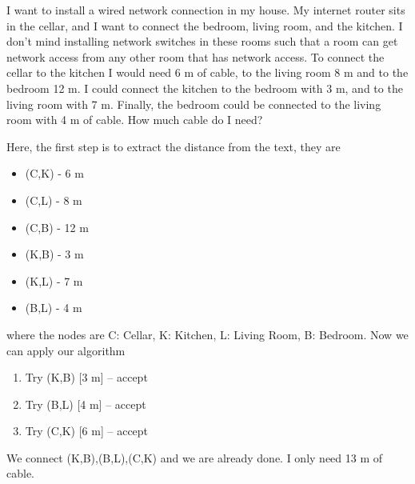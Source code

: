 




I want to install a wired network connection in my house. My internet router sits in the cellar, and I want to connect the bedroom, living room, and the kitchen. I don't mind installing network switches in these rooms such that a room can get network access from any other room that has network access. To connect the cellar to the kitchen I would need 6 m of cable, to the living room 8 m and to the bedroom 12 m. I could connect the kitchen to the bedroom with 3 m, and to the living room with 7 m. Finally, the bedroom could be connected to the living room with 4 m of cable. How much cable do I need? 


\solution
Here, the first step is to extract the distance from the text, they are 
\begin{itemize}
\item (C,K) - 6 m
\item (C,L) - 8 m
\item (C,B) - 12 m
\item (K,B) - 3 m
\item (K,L) - 7 m
\item (B,L) - 4 m
\end{itemize}
where the nodes are C: Cellar, K: Kitchen, L: Living Room, B: Bedroom. Now we can apply our algorithm
\begin{enumerate}[label=\arabic*.]
\item Try (K,B) [3 m] -- accept
\item Try (B,L) [4 m] -- accept
\item Try (C,K) [6 m] -- accept
\end{enumerate}
We connect (K,B),(B,L),(C,K) and we are already done. I only need 13 m of cable.

